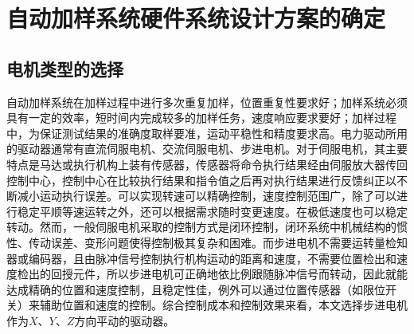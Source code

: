 \chapter{自动加样系统硬件系统设计方案的确定}
\section{电机类型的选择}
自动加样系统在加样过程中进行多次重复加样，位置重复性要求好；加样系统必须具有一定的效率，短时间内完成较多的加样任务，速度响应要求要好；加样过程中，为保证测试结果的准确度取样要准，运动平稳性和精度要求高。电力驱动所用的驱动器通常有直流伺服电机、交流伺服电机、步进电机。对于伺服电机，其主要特点是马达或执行机构上装有传感器，传感器将命令执行结果经由伺服放大器传回控制中心，控制中心在比较执行结果和指令值之后再对执行结果进行反馈纠正以不断减小运动执行误差。可以实现转速可以精确控制，速度控制范围广，除了可以进行稳定平顺等速运转之外，还可以根据需求随时变更速度。在极低速度也可以稳定转动。然而，一般伺服电机采取的控制方式是闭环控制，闭环系统中机械结构的惯性、传动误差、变形问题使得控制极其复杂和困难。而步进电机不需要运转量检知器或编码器，且由脉冲信号控制执行机构运动的距离和速度，不需要位置检出和速度检出的回授元件，所以步进电机可正确地依比例跟随脉冲信号而转动，因此就能达成精确的位置和速度控制，且稳定性佳，例外可以通过位置传感器（如限位开关）来辅助位置和速度的控制。综合控制成本和控制效果来看，本文选择步进电机作为$X$、$Y$、$Z$方向平动的驱动器。












